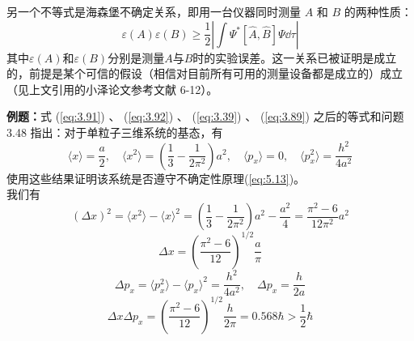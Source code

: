     另一个不等式是海森堡不确定关系，即用一台仪器同时测量 $A$ 和 $B$ 的两种性质：
    \begin{equation*}
        \varepsilon\left(A\right)\varepsilon\left(B\right) \ge \frac{1}{2}\left|\int \Psi^{\ast}\left[\hat{A},\hat{B}\right]\Psi\dd \tau\right|
    \end{equation*}
    其中$\varepsilon\left(A\right)$和$\varepsilon\left(B\right)$分别是测量$A$与$B$时的实验误差。这一关系已被证明是成立的，前提是某个可信的假设（相信对目前所有可用的测量设备都是成立的）成立（见上文引用的小泽论文参考文献 6-12）。
    \begin{examplebox}
        \textbf{例题：}式 (\ref{eq:3.91}) 、 (\ref{eq:3.92}) 、 (\ref{eq:3.39}) 、 (\ref{eq:3.89}) 之后的等式和问题 3.48 指出：对于单粒子三维系统的基态，有
        \begin{equation*}
            \langle x \rangle = \frac{a}{2}, \quad \langle x^2 \rangle = \left(\frac{1}{3}-\frac{1}{2\pi^2}\right)a^2, \quad \langle p_x \rangle = 0, \quad \langle p_x^2 \rangle = \frac{h^2}{4a^2}
        \end{equation*}
        使用这些结果证明该系统是否遵守不确定性原理(\ref{eq:5.13})。
        \\ 
        
        我们有
        \begin{equation*}
            \left(\Delta x\right)^2 = \langle x^2 \rangle - \langle x \rangle^2 = \left(\frac{1}{3}-\frac{1}{2\pi^2}\right)a^2 - \frac{a^2}{4} = \frac{\pi^2-6}{12\pi^2}a^2
        \end{equation*}
        \begin{equation*}
            \Delta x = \left(\frac{\pi^2-6}{12}\right)^{1/2}\frac{a}{\pi}
        \end{equation*}
        \begin{equation*}
            \Delta p_x = \langle p_x^2 \rangle - \langle p_x \rangle^2 = \frac{h^2}{4a^2}, \quad \Delta p_x = \frac{h}{2a}
        \end{equation*}
        \begin{equation*}
            \Delta x \Delta p_x = \left(\frac{\pi^2-6}{12}\right)^{1/2}\frac{h}{2\pi} = 0.568\hbar > \frac{1}{2}\hbar
        \end{equation*}
    \end{examplebox}

